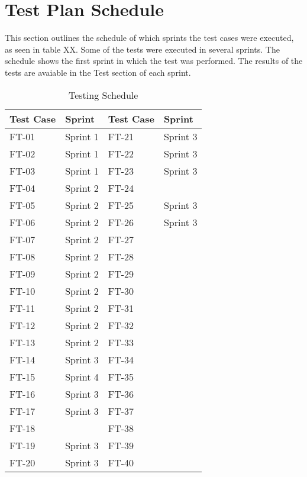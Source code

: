 \section{Test Plan Schedule}

This section outlines the schedule of which sprints the test cases were executed, as seen in table XX. Some of the tests were executed in several sprints. The schedule shows the first sprint in which the test was performed. The results of the tests are avaiable in the Test section of each sprint.


\begin{table}[h]
\centering
\begin{tabular}{| l | l || l | l |}
	\rowcolor{lightgray}
	\hline
	{\bf Test Case} & {\bf Sprint} & {\bf Test Case} & {\bf Sprint} \\ \hline
	FT-01 & Sprint 1 & FT-21 & Sprint 3 \\ \hline
	FT-02 & Sprint 1 & FT-22 & Sprint 3 \\ \hline
	FT-03 & Sprint 1 & FT-23 & Sprint 3 \\ \hline
	FT-04 & Sprint 2 & FT-24 & 			\\ \hline
	FT-05 & Sprint 2 & FT-25 & Sprint 3 \\ \hline
	FT-06 & Sprint 2 & FT-26 & Sprint 3 \\ \hline
	FT-07 & Sprint 2 & FT-27 & 			\\ \hline
	FT-08 & Sprint 2 & FT-28 & \\ \hline
	FT-09 & Sprint 2 & FT-29 & \\ \hline
	FT-10 & Sprint 2 & FT-30 & \\ \hline
	FT-11 & Sprint 2 & FT-31 & \\ \hline
	FT-12 & Sprint 2 & FT-32 & \\ \hline 
	FT-13 & Sprint 2 & FT-33 & \\ \hline
	FT-14 & Sprint 3 & FT-34 & \\ \hline
	FT-15 & Sprint 4 & FT-35 & \\ \hline
	FT-16 & Sprint 3 & FT-36 & \\ \hline
	FT-17 & Sprint 3 & FT-37 & \\ \hline
	FT-18 & 		 & FT-38 & \\ \hline
	FT-19 & Sprint 3 & FT-39 & \\ \hline
	FT-20 & Sprint 3 & FT-40 & \\ \hline
\end{tabular}
\caption{Testing Schedule}
\end{table}